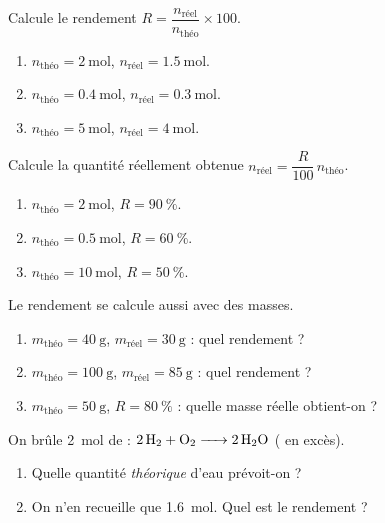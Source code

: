 \documentclass[11pt,a4paper]{article}
\begin{document}
\begin{exo}
Calcule le rendement $R=\dfrac{n_{\text{réel}}}{n_{\text{théo}}}\times100$.
\begin{enumerate}[label=\alph*)]
  \item $n_{\text{théo}}=\qty{2}{\mole}$, $n_{\text{réel}}=\qty{1.5}{\mole}$.
  \item $n_{\text{théo}}=\qty{0.4}{\mole}$, $n_{\text{réel}}=\qty{0.3}{\mole}$.
  \item $n_{\text{théo}}=\qty{5}{\mole}$, $n_{\text{réel}}=\qty{4}{\mole}$.
\end{enumerate}
\end{exo}

\begin{exo}
Calcule la quantité réellement obtenue $n_{\text{réel}}=\dfrac{R}{100}\,n_{\text{théo}}$.
\begin{enumerate}[label=\alph*)]
  \item $n_{\text{théo}}=\qty{2}{\mole}$, $R=\qty{90}{\percent}$.
  \item $n_{\text{théo}}=\qty{0.5}{\mole}$, $R=\qty{60}{\percent}$.
  \item $n_{\text{théo}}=\qty{10}{\mole}$, $R=\qty{50}{\percent}$.
\end{enumerate}
\end{exo}

\begin{exo}
Le rendement se calcule aussi avec des masses.
\begin{enumerate}[label=\alph*)]
  \item $m_{\text{théo}}=\qty{40}{\gram}$, $m_{\text{réel}}=\qty{30}{\gram}$ : quel rendement ?
  \item $m_{\text{théo}}=\qty{100}{\gram}$, $m_{\text{réel}}=\qty{85}{\gram}$ : quel rendement ?
  \item $m_{\text{théo}}=\qty{50}{\gram}$, $R=\qty{80}{\percent}$ : quelle masse réelle obtient-on ?
\end{enumerate}
\end{exo}

\begin{exo}
On brûle \qty{2}{\mole} de  : $\ce{2 H2 + O2 -> 2 H2O}$ ( en excès).
\begin{enumerate}[label=\alph*)]
  \item Quelle quantité \emph{théorique} d'eau prévoit-on ?
  \item On n'en recueille que \qty{1.6}{\mole}. Quel est le rendement ?
\end{enumerate}
\end{exo}
\end{document}
